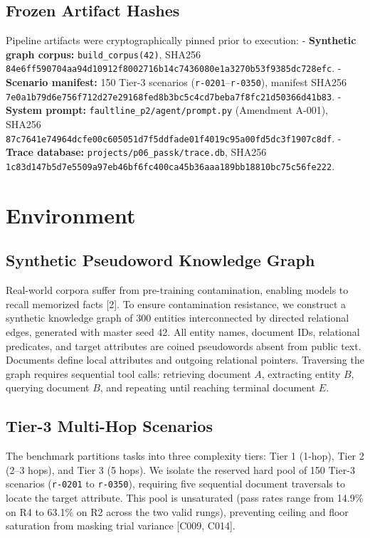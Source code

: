 \documentclass[11pt,letterpaper]{article}
\begin{document}
\subsection{Frozen Artifact Hashes}
Pipeline artifacts were cryptographically pinned prior to execution:
- \textbf{Synthetic graph corpus:} \texttt{build\_corpus(42)}, SHA256 \nolinkurl{84e6ff590704aa94d10912f8002716b14c7436080e1a3270b53f9385dc728efc}.
- \textbf{Scenario manifest:} 150 Tier-3 scenarios (\texttt{r-0201}–\texttt{r-0350}), manifest SHA256 \nolinkurl{7e0a1b79d6e756f712d27e29168fed8b3bc5c4cd7beba7f8fc21d50366d41b83}.
- \textbf{System prompt:} \texttt{faultline\_p2/agent/prompt.py} (Amendment A-001), SHA256 \nolinkurl{87c7641e74964dcfe00c605051d7f5ddfade01f4019c95a00fd5dc3f1907c8df}.
- \textbf{Trace database:} \texttt{projects/p06\_passk/trace.db}, SHA256 \nolinkurl{1c83d147b5d7e5509a97eb46bf6fc400ca45b36aaa189bb18810bc75c56fe222}.



\section{Environment}

\subsection{Synthetic Pseudoword Knowledge Graph}
Real-world corpora suffer from pre-training contamination, enabling models to recall memorized facts [2]. To ensure contamination resistance, we construct a synthetic knowledge graph of 300 entities interconnected by directed relational edges, generated with master seed 42. All entity names, document IDs, relational predicates, and target attributes are coined pseudowords absent from public text. Documents define local attributes and outgoing relational pointers. Traversing the graph requires sequential tool calls: retrieving document $A$, extracting entity $B$, querying document $B$, and repeating until reaching terminal document $E$.

\subsection{Tier-3 Multi-Hop Scenarios}
The benchmark partitions tasks into three complexity tiers: Tier 1 (1-hop), Tier 2 (2–3 hops), and Tier 3 (5 hops). We isolate the reserved hard pool of 150 Tier-3 scenarios (\texttt{r-0201} to \texttt{r-0350}), requiring five sequential document traversals to locate the target attribute. This pool is unsaturated (pass rates range from 14.9\% on R4 to 63.1\% on R2 across the two valid rungs), preventing ceiling and floor saturation from masking trial variance [C009, C014].
\end{document}
